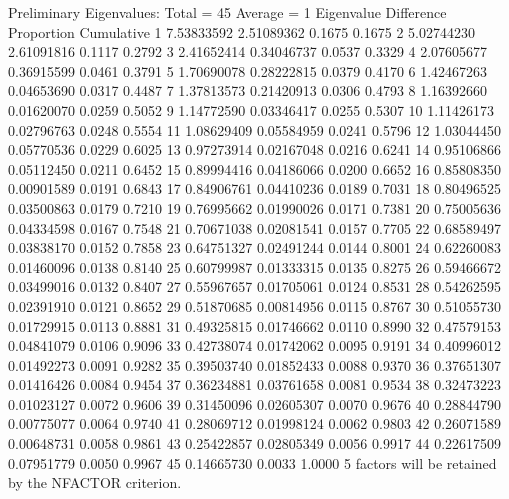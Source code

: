 \documentclass{article}
\begin{document}
\begin{Woutput}
      Preliminary Eigenvalues: Total = 45  Average = 1
        Eigenvalue    Difference    Proportion    Cumulative
   1    7.53833592    2.51089362        0.1675        0.1675
   2    5.02744230    2.61091816        0.1117        0.2792
   3    2.41652414    0.34046737        0.0537        0.3329
   4    2.07605677    0.36915599        0.0461        0.3791
   5    1.70690078    0.28222815        0.0379        0.4170
   6    1.42467263    0.04653690        0.0317        0.4487
   7    1.37813573    0.21420913        0.0306        0.4793
   8    1.16392660    0.01620070        0.0259        0.5052
   9    1.14772590    0.03346417        0.0255        0.5307
  10    1.11426173    0.02796763        0.0248        0.5554
  11    1.08629409    0.05584959        0.0241        0.5796
  12    1.03044450    0.05770536        0.0229        0.6025
  13    0.97273914    0.02167048        0.0216        0.6241
  14    0.95106866    0.05112450        0.0211        0.6452
  15    0.89994416    0.04186066        0.0200        0.6652
  16    0.85808350    0.00901589        0.0191        0.6843
  17    0.84906761    0.04410236        0.0189        0.7031
  18    0.80496525    0.03500863        0.0179        0.7210
  19    0.76995662    0.01990026        0.0171        0.7381
  20    0.75005636    0.04334598        0.0167        0.7548
  21    0.70671038    0.02081541        0.0157        0.7705
  22    0.68589497    0.03838170        0.0152        0.7858
  23    0.64751327    0.02491244        0.0144        0.8001
  24    0.62260083    0.01460096        0.0138        0.8140
  25    0.60799987    0.01333315        0.0135        0.8275
  26    0.59466672    0.03499016        0.0132        0.8407
  27    0.55967657    0.01705061        0.0124        0.8531
  28    0.54262595    0.02391910        0.0121        0.8652
  29    0.51870685    0.00814956        0.0115        0.8767
  30    0.51055730    0.01729915        0.0113        0.8881
  31    0.49325815    0.01746662        0.0110        0.8990
  32    0.47579153    0.04841079        0.0106        0.9096
  33    0.42738074    0.01742062        0.0095        0.9191
  34    0.40996012    0.01492273        0.0091        0.9282
  35    0.39503740    0.01852433        0.0088        0.9370
  36    0.37651307    0.01416426        0.0084        0.9454
  37    0.36234881    0.03761658        0.0081        0.9534
  38    0.32473223    0.01023127        0.0072        0.9606
  39    0.31450096    0.02605307        0.0070        0.9676
  40    0.28844790    0.00775077        0.0064        0.9740
  41    0.28069712    0.01998124        0.0062        0.9803
  42    0.26071589    0.00648731        0.0058        0.9861
  43    0.25422857    0.02805349        0.0056        0.9917
  44    0.22617509    0.07951779        0.0050        0.9967
  45    0.14665730                      0.0033        1.0000
5 factors will be retained by the NFACTOR criterion.


\end{Woutput}
\end{document}
